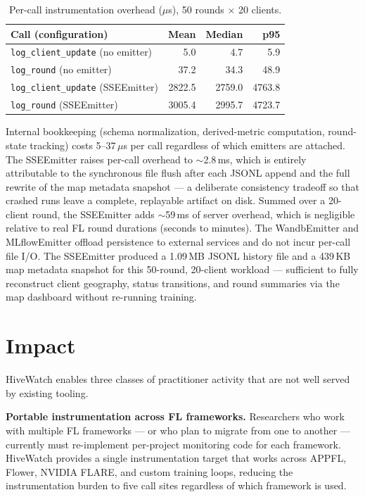 \documentclass[preprint,12pt, a4paper]{elsarticle}
\begin{document}
\begin{table}[t]
\caption{Per-call instrumentation overhead ($\mu$s), 50 rounds $\times$ 20 clients.}
\label{tab:overhead}
\centering
\begin{tabular}{lrrr}
\toprule
\textbf{Call (configuration)} & \textbf{Mean} & \textbf{Median} & \textbf{p95} \\
\midrule
\texttt{log\_client\_update} (no emitter) & 5.0 & 4.7 & 5.9 \\
\texttt{log\_round} (no emitter)           & 37.2 & 34.3 & 48.9 \\
\texttt{log\_client\_update} (SSEEmitter)  & 2822.5 & 2759.0 & 4763.8 \\
\texttt{log\_round} (SSEEmitter)           & 3005.4 & 2995.7 & 4723.7 \\
\bottomrule
\end{tabular}
\end{table}

Internal bookkeeping (schema normalization, derived-metric computation, round-state tracking) costs 5--37\,$\mu$s per call regardless of which emitters are attached. The SSEEmitter raises per-call overhead to $\sim$2.8\,ms, which is entirely attributable to the synchronous file flush after each JSONL append and the full rewrite of the map metadata snapshot — a deliberate consistency tradeoff so that crashed runs leave a complete, replayable artifact on disk. Summed over a 20-client round, the SSEEmitter adds $\sim$59\,ms of server overhead, which is negligible relative to real FL round durations (seconds to minutes). The WandbEmitter and MLflowEmitter offload persistence to external services and do not incur per-call file I/O. The SSEEmitter produced a 1.09\,MB JSONL history file and a 439\,KB map metadata snapshot for this 50-round, 20-client workload — sufficient to fully reconstruct client geography, status transitions, and round summaries via the map dashboard without re-running training.

\section{Impact}
\label{sec:impact}
HiveWatch enables three classes of practitioner activity that are not well served by existing tooling.

\textbf{Portable instrumentation across FL frameworks.} Researchers who work with multiple FL frameworks — or who plan to migrate from one to another — currently must re-implement per-project monitoring code for each framework. HiveWatch provides a single instrumentation target that works across APPFL, Flower, NVIDIA FLARE, and custom training loops, reducing the instrumentation burden to five call sites regardless of which framework is used.
\end{document}

